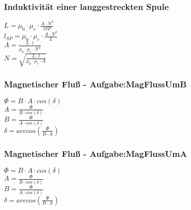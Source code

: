 \subsubsection{Induktivität einer langgestreckten Spule} 
\begin{minipage}{0.45\textwidth} 
$ L = \mu _{0} \cdot \mu _{r} \cdot \frac{A\cdot N^{2} }{lSP} $\\ 
$ l_{SP} = \mu _{0} \cdot \mu _{r} \cdot \frac{A\cdot N^{2} }{L} $\\ 
$ A = \frac{ L\cdot l}{\mu _{0} \cdot \mu _{r} \cdot N^{2} } $\\ 
$ N = \sqrt{\frac{ L\cdot l}{\mu _{0} \cdot \mu _{r} \cdot A}} $\\ 
\end{minipage} 
\begin{minipage}{0.45\textwidth} 
 
\end{minipage} 
\subsubsection{Magnetischer Fluß - Aufgabe:MagFlussUmB} 
\begin{minipage}{0.45\textwidth} 
$ \Phi  = B\cdot A\cdot cos(\delta ) $\\ 
$ A = \frac{ \Phi }{B\cdot cos(\delta )} $\\ 
$ B = \frac{ \Phi }{A\cdot cos(\delta )} $\\ 
$ \delta =arccos(\frac{ \Phi }{B\cdot A}) $\\ 
\end{minipage} 
\begin{minipage}{0.45\textwidth} 
 
\end{minipage} 
\subsubsection{Magnetischer Fluß - Aufgabe:MagFlussUmA} 
\begin{minipage}{0.45\textwidth} 
$ \Phi  = B\cdot A\cdot cos(\delta ) $\\ 
$ A = \frac{ \Phi }{B\cdot cos(\delta )} $\\ 
$ B = \frac{ \Phi }{A\cdot cos(\delta )} $\\ 
$ \delta =arccos(\frac{ \Phi }{B\cdot A}) $\\ 
\end{minipage} 
\begin{minipage}{0.45\textwidth} 
 
\end{minipage} 
